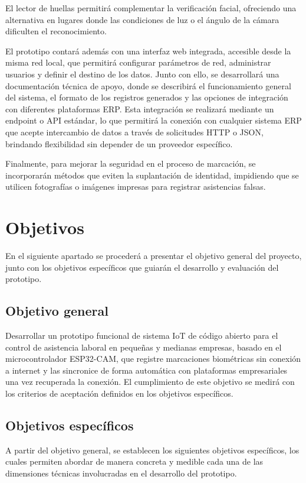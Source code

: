 \documentclass{iccmemoria}
\begin{document}
El lector de huellas permitirá complementar la verificación facial, ofreciendo una alternativa en lugares donde las condiciones de luz o el ángulo de la cámara dificulten el reconocimiento.

El prototipo contará además con una interfaz web integrada, accesible desde la misma red local, que permitirá configurar parámetros de red, administrar usuarios y definir el destino de los datos. Junto con ello, se desarrollará una documentación técnica de apoyo, donde se describirá el funcionamiento general del sistema, el formato de los registros generados y las opciones de integración con diferentes plataformas ERP. Esta integración se realizará mediante un endpoint o API estándar, lo que permitirá la conexión con cualquier sistema ERP que acepte intercambio de datos a través de solicitudes HTTP o JSON, brindando flexibilidad sin depender de un proveedor específico.

Finalmente, para mejorar la seguridad en el proceso de marcación, se incorporarán métodos que eviten la suplantación de identidad, impidiendo que se utilicen fotografías o imágenes impresas para registrar asistencias falsas.

\section{Objetivos}
En el siguiente apartado se procederá a presentar el objetivo general del proyecto, junto con los objetivos específicos que guiarán el desarrollo y evaluación del prototipo.

\subsection{Objetivo general}
Desarrollar un prototipo funcional de sistema IoT de código abierto para el control de asistencia laboral en pequeñas y medianas empresas, basado en el microcontrolador ESP32-CAM, que registre marcaciones biométricas sin conexión a internet y las sincronice de forma automática con plataformas empresariales una vez recuperada la conexión. El cumplimiento de este objetivo se medirá con los criterios de aceptación definidos en los objetivos específicos.

\subsection{Objetivos específicos}
A partir del objetivo general, se establecen los siguientes objetivos específicos, los cuales permiten abordar de manera concreta y medible cada una de las dimensiones técnicas involucradas en el desarrollo del prototipo.
\end{document}
